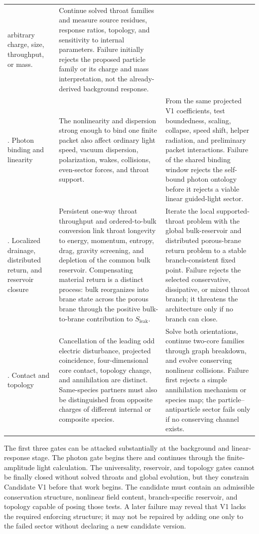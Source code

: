 \begin{longtable}{@{}L{0.12\textwidth}L{0.39\textwidth}L{0.41\textwidth}@{}}
  arbitrary charge, size, throughput, or mass.
& Continue solved throat families and measure source residues, response ratios,
  topology, and sensitivity to internal parameters. Failure initially rejects
  the proposed particle family or its charge and mass interpretation, not the
  already-derived background response. \\
. Photon binding and linearity
& The nonlinearity and dispersion strong enough to bind one finite packet also
  affect ordinary light speed, vacuum dispersion, polarization, wakes,
  collisions, even-sector forces, and throat support.
& From the same projected V1 coefficients, test boundedness, scaling, collapse,
  speed shift, helper radiation, and preliminary packet interactions. Failure
  of the shared binding window rejects the self-bound photon ontology before it
  rejects a viable linear guided-light sector. \\
. Localized drainage, distributed return, and reservoir closure
& Persistent one-way throat throughput and ordered-to-bulk conversion link
  throat longevity to energy, momentum, entropy, drag, gravity screening, and
  depletion of the common bulk reservoir. Compensating material return is a
  distinct process: bulk reorganizes into brane state across the porous brane
  through the positive bulk-to-brane contribution to \(S_{\mathrm{leak}}\).
& Iterate the local supported-throat problem with the global bulk-reservoir and
  distributed porous-brane return problem to a stable branch-consistent fixed
  point. Failure rejects the selected conservative, dissipative, or mixed
  throat branch; it threatens the architecture only if no branch can close. \\
. Contact and topology
& Cancellation of the leading odd electric disturbance, projected coincidence,
  four-dimensional core contact, topology change, and annihilation are distinct.
  Same-species partners must also be distinguished from opposite charges of
  different internal or composite species.
& Solve both orientations, continue two-core families through graph breakdown,
  and evolve conserving nonlinear collisions. Failure first rejects a simple
  annihilation mechanism or species map; the particle--antiparticle sector fails
  only if no conserving channel exists. \\
\bottomrule
\end{longtable}
\endgroup

The first three gates can be attacked substantially at the background and
linear-response stage. The photon gate begins there and continues through the
finite-amplitude light calculation. The universality, reservoir, and topology
gates cannot be finally closed without solved throats and global evolution, but
they constrain Candidate V1 before that work begins. The candidate must contain
an admissible conservation structure, nonlinear field content, branch-specific
reservoir, and topology capable of posing those tests. A later failure may reveal
that V1 lacks the required enforcing structure; it may not be repaired by adding
one only to the failed sector without declaring a new candidate version.

